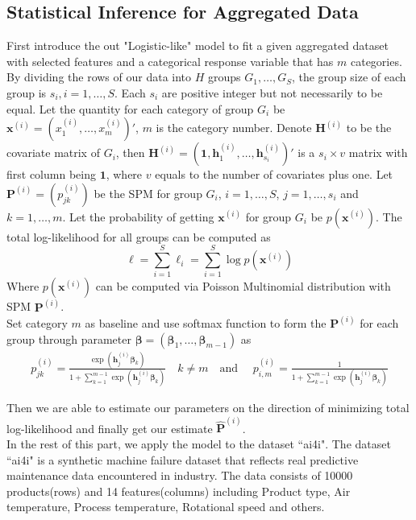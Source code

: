 \documentclass[12pt]{article}
\newcommand{\Pmat}{\mathbf{P}}
\newcommand{\wh}{\widehat}
\begin{document}
\subsection{Statistical Inference for Aggregated Data}\label{sec:model.est.inf}	
First introduce the out "Logistic-like" model to fit a given aggregated dataset with selected features and a categorical response variable that has $m$ categories. By dividing the rows of our data into $H$ groups $G_1,\dots,G_{S}$, the group size of each group is $s_i,i=1,\dots,S$. Each $s_i$ are positive integer but not necessarily to be equal. Let the quantity for each category of group $G_i$ be $\boldsymbol{x}^{(i)} = (x_1^{(i)}, \dots, x_m^{(i)})'$, $m$ is the category number. Denote $\boldsymbol{H}^{(i)}$ to be the covariate matrix of $G_i$, then $\boldsymbol{H}^{(i)} = (\boldsymbol{1}, \boldsymbol{h}_{1}^{(i)},\dots,\boldsymbol{h}_{s_i}^{(i)})'$ is a $s_i \times v$ matrix with first column being $\boldsymbol{1}$, where $v$ equals to the number of covariates plus one. Let $\Pmat^{(i)} = (p_{jk}^{(i)})$ be the SPM for group $G_i$, $i = 1, \dots, S$, $j = 1,\dots ,s_i$ and $k = 1,\dots, m$. Let the probability of getting $\boldsymbol{x}^{(i)}$ for group $G_i$ be $p(\boldsymbol{x}^{(i)})$. The total log-likelihood for all groups can be computed as
\begin{equation*}
    \ell = \sum_{i=1}^{S}\ell_i = \sum_{i=1}^{S}\log p(\boldsymbol{x}^{(i)})
\end{equation*}
Where $p(\boldsymbol{x}^{(i)})$ can be computed via Poisson Multinomial distribution with SPM $\Pmat^{(i)}$.\\
Set category $m$ as baseline and use softmax function to form the $\Pmat^{(i)}$ for each group through parameter $\boldsymbol{\beta} = (\boldsymbol{\beta}_1, \dots, \boldsymbol{\beta}_{m-1})$ as
\begin{align*}
    p_{j k}^{(i)} = \frac{\exp{\left(\boldsymbol{h}_{j}^{(i)} \boldsymbol{\beta}_{k}\right)}}{1 + \sum_{k=1}^{m-1}\exp{\left( \boldsymbol{h}_{j}^{(i)} \boldsymbol{\beta}_{k} \right)}}
    \quad k \neq m \quad \text{and } \quad
    p_{i,m}^{(i)} = \frac{1}{1 + \sum_{k=1}^{m-1}\exp{\left( \boldsymbol{h}_{j}^{(i)} \boldsymbol{\beta}_{k} \right)}}
\end{align*}

Then we are able to estimate our parameters on the direction of minimizing total log-likelihood and finally get our estimate $\wh{\Pmat}^{(i)}$. \\
In the rest of this part, we apply the model to the dataset ``ai4i". The dataset ``ai4i" is a synthetic machine failure dataset that reflects real predictive maintenance data encountered in industry. The data consists of 10000 products(rows) and 14 features(columns) including Product type, Air temperature, Process temperature, Rotational speed and others.
\end{document}
